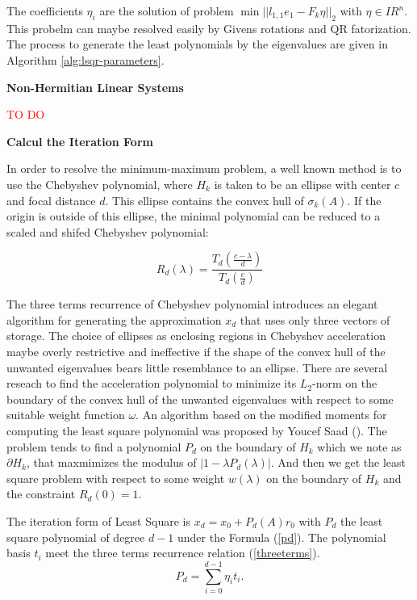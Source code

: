 The coefficients \(\eta_i\) are the solution of problem \(\min ||l_{1,1}e_1-F_k\eta||_2\) with \(\eta \in IR^n\). This probelm can maybe resolved easily by Givens rotations and QR fatorization. The process to generate the least polynomials by the eigenvalues are given in Algorithm \ref{alg:lsqr-parameters}.

\textbf{Non-Hermitian Linear Systems}

\textcolor{red}{TO DO}

\textbf{Calcul the Iteration Form}

In order to resolve the minimum-maximum problem, a well known method is to use the Chebyshev polynomial, where \(H_k\) is taken to be an ellipse with center \(c\) and focal distance \(d\). This ellipse contains the convex hull of \(\sigma_k(A)\). If the origin is outside of this ellipse, the minimal polynomial can be reduced to a scaled and shifed Chebyshev polynomial:

\begin{equation}
R_d(\lambda)=\frac{T_d(\frac{c-\lambda}{d})}{T_d (\frac{c}{d})}
\end{equation}

The three terms recurrence of Chebyshev polynomial introduces an elegant algorithm for generating the approximation \(x_d\) that uses only three vectors of storage. The choice of ellipses as enclosing regions in Chebyshev acceleration maybe overly restrictive and ineffective if the shape of the convex hull of the unwanted eigenvalues bears little resemblance to an ellipse. There are several reseach to find the acceleration polynomial to minimize its $L_2$-norm on the boundary of the convex hull of the unwanted eigenvalues with respect to some suitable weight function $\omega$. An algorithm based on the modified moments  for computing the least square polynomial was proposed by Youcef Saad (\cite{saad1987least}). The problem tends to find a polynomial \(P_d\) on the boundary of \(H_k\) which we note as \(\partial H_k\), that maxmimizes the modulus of \(|1-\lambda P_d(\lambda)|\). And then we get the least square problem with respect to some weight \(w(\lambda)\) on the boundary of \(H_k\) and the constraint \(R_d(0)=1\).

The iteration form of Least Square is \(x_d=x_0+P_d(A)r_0\) with \(P_d\) the least square polynomial of degree \(d-1\) under the Formula (\ref{pd}). The polynomial basis \(t_i\) meet the three terms recurrence relation (\ref{threeterms}). 
\begin{equation}
\label{pd}
P_d=\sum_{i=0}^{d-1}\eta_it_i.
\end{equation}

